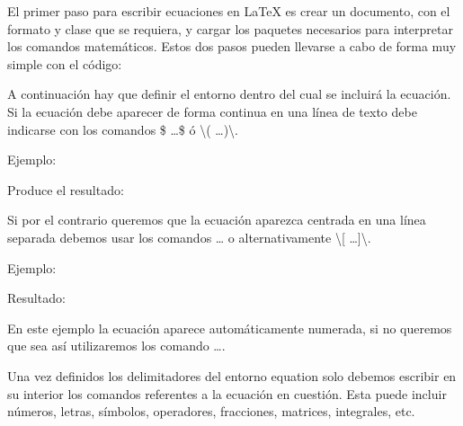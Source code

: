 \documentclass[11pt, a4paper]{article}
\begin{document}
El primer paso para escribir ecuaciones en LaTeX es crear un documento, con el formato y clase que se requiera, y cargar los paquetes necesarios para interpretar los comandos matemáticos. Estos dos pasos pueden llevarse a cabo de forma muy simple con el código:

	 

 




A continuación hay que definir el entorno dentro del cual se incluirá la ecuación. Si la ecuación debe aparecer de forma continua en una línea de texto debe indicarse con los comandos \$ \dots \$ ó \textbackslash( \dots )\textbackslash.

Ejemplo:  

Produce el resultado:  

Si por el contrario queremos que la ecuación aparezca centrada en una línea separada debemos usar los comandos  \dots {} o alternativamente \textbackslash[ \dots ]\textbackslash.

Ejemplo:

	



	
Resultado:
	

En este ejemplo la ecuación aparece automáticamente numerada, si no queremos que sea así utilizaremos los comando  \dots {}.

Una vez definidos los delimitadores del entorno equation solo debemos escribir en su interior los comandos referentes a la ecuación en cuestión. Esta puede incluir números, letras, símbolos, operadores, fracciones, matrices, integrales, etc.
\end{document}
